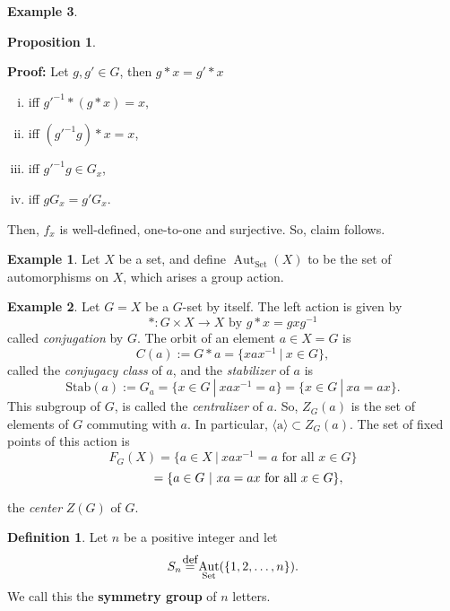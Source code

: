 \documentclass[11pt]{amsbook}%
\newcommand{\ii}{\item}
\newcommand\defeq{\stackrel{\mathclap{\normalfont\mbox{\small{def}}}}{=}}
\theoremstyle{plain}
\theoremstyle{definition}
\newtheorem{definition*}{Definition}
\newtheorem*{example*}{Example}
\newtheorem{proposition}[theorem]{Proposition}
\numberwithin{equation}{section}
\newcommand{\lrangle}[1]{\langle \text{#1} \rangle}
\DeclareMathOperator{\Aut}{Aut}
\newcommand{\Stab}[1]{\text{Stab}(#1)}
\begin{document}
\begin{example*}
\begin{proposition}
$$  $$
\end{proposition} \vspace{1.8em}
\textbf{Proof: }Let $g, g' \in G$, then $g*x = g'*x$
\begin{enumerate}[i. ]
    \ii iff $g'^{-1}*(g*x) = x$,
    \ii iff $(g'^{-1}g)*x = x$,
    \ii iff $g'^{-1}g \in G_{x}$,
    \ii iff $gG_{x} = g'G_{x}$.
\end{enumerate}
Then, $f_{x}$ is well-defined, one-to-one and surjective. So, claim follows. \qedsymbol
\begin{example*}
  Let $X$ be a set, and define $\Aut_{\text{Set}}(X)$ to be the set of automorphisms on $X$,
  which arises a group action.
\end{example*}

\begin{example*}
  Let $G = X$ be a $G$-set by itself. The left action is given by
  $$
  *: G \times X \longrightarrow X \text{ by } g*x = gxg^{-1}
  $$
  called \textit{conjugation} by $G$. The orbit of an element $a \in X = G$ is 
  $$
  C(a) := G*a = \{xax^{-1} \ | \ x \in G\},
  $$
  called the \textit{conjugacy class} of $a$, and the \textit{stabilizer} of $a$ is
  $$
  \Stab{a} := G_{a} = \{x \in G \ | \ xax^{-1} = a\} = \{x \in G \ | \ xa = ax\}.
  $$
  This subgroup of $G$, is called the \textit{centralizer} of $a$. So, $Z_{G}(a)$
  is the set of elements of $G$ commuting with $a$. In particular, $\lrangle{a} \subset Z_{G}(a)$.
  The set of fixed points of this action is
  $$
  F_{G}(X) = \{a \in X \ | \ xax^{-1} = a \text{ for all } x \in G\} 
  $$
  $$
  \hspace{2.5em} = \{a \in G \ | \ xa = ax \text{ for all } x \in G \},
  $$

  the \textit{center} $Z(G)$ of $G$.


\begin{definition*}
  Let $n$ be a positive integer and let
  $$
  S_{n} \defeq \Aut_{\text{Set}}(\{1, 2, \dots, n\}).
  $$
  We call this the \textbf{symmetry group} of $n$ letters.
\end{definition*}


\end{example*}
\end{example*}
\end{document}
